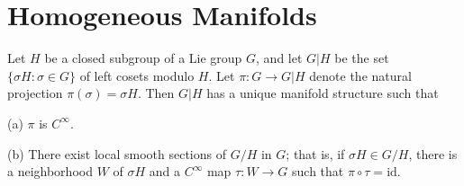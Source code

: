 \section{Homogeneous Manifolds}

\begin{theorem}\label{thm:3.58}
Let $H$ be a closed subgroup of a Lie group $G$, and let $G|H$ be the set $\{\sigma H: \sigma \in G\}$ of left cosets modulo $H$. Let $\pi: G \to G|H$ denote the natural projection $\pi(\sigma) = \sigma H$. Then $G|H$ has a unique manifold structure such that

(a)  $ \pi $ is  $ C^{\infty} $.

(b) There exist local smooth sections of $G/H$ in $G$; that is, if $\sigma H \in G/H$, there is a neighborhood $W$ of $\sigma H$ and a $C^\infty$ map $\tau: W \to G$ such that $\pi \circ \tau = \mathrm{id}$.

\end{theorem}

